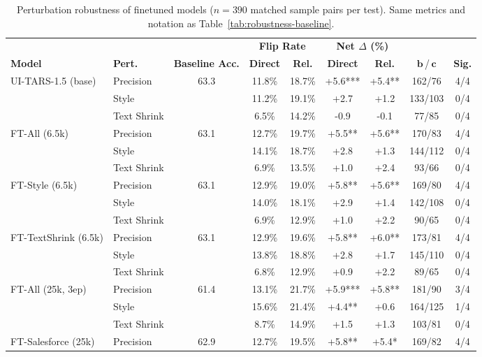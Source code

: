 \begin{table}[ht]
\centering
\caption{Perturbation robustness of finetuned models ($n = 390$ matched sample pairs per test). Same metrics and notation as Table~\ref{tab:robustness-baseline}.}
\label{tab:robustness-finetuned}
\scriptsize
\begin{tabular}{llc cc cc cc}
\toprule
 & & & \multicolumn{2}{c}{\textbf{Flip Rate}} & \multicolumn{2}{c}{\textbf{Net $\Delta$ (\%)}} & & \\
\cmidrule(lr){4-5} \cmidrule(lr){6-7}
\textbf{Model} & \textbf{Pert.} & \textbf{Baseline Acc.} & \textbf{Direct} & \textbf{Rel.} & \textbf{Direct} & \textbf{Rel.} & $\boldsymbol{b}$\,/\,$\boldsymbol{c}$ & \textbf{Sig.} \\
\midrule
UI-TARS-1.5 (base) & Precision & 63.3 & 11.8\% & 18.7\% & +5.6*** & +5.4** & 162/76 & 4/4 \\
 & Style &  & 11.2\% & 19.1\% & +2.7 & +1.2 & 133/103 & 0/4 \\
 & Text Shrink &  & 6.5\% & 14.2\% & -0.9 & -0.1 & 77/85 & 0/4 \\
\midrule
FT-All (6.5k) & Precision & 63.1 & 12.7\% & 19.7\% & +5.5** & +5.6** & 170/83 & 4/4 \\
 & Style &  & 14.1\% & 18.7\% & +2.8 & +1.3 & 144/112 & 0/4 \\
 & Text Shrink &  & 6.9\% & 13.5\% & +1.0 & +2.4 & 93/66 & 0/4 \\
\midrule
FT-Style (6.5k) & Precision & 63.1 & 12.9\% & 19.0\% & +5.8** & +5.6** & 169/80 & 4/4 \\
 & Style &  & 14.0\% & 18.1\% & +2.9 & +1.4 & 142/108 & 0/4 \\
 & Text Shrink &  & 6.9\% & 12.9\% & +1.0 & +2.2 & 90/65 & 0/4 \\
\midrule
FT-TextShrink (6.5k) & Precision & 63.1 & 12.9\% & 19.6\% & +5.8** & +6.0** & 173/81 & 4/4 \\
 & Style &  & 13.8\% & 18.8\% & +2.8 & +1.7 & 145/110 & 0/4 \\
 & Text Shrink &  & 6.8\% & 12.9\% & +0.9 & +2.2 & 89/65 & 0/4 \\
\midrule
FT-All (25k, 3ep) & Precision & 61.4 & 13.1\% & 21.7\% & +5.9*** & +5.8** & 181/90 & 3/4 \\
 & Style &  & 15.6\% & 21.4\% & +4.4** & +0.6 & 164/125 & 1/4 \\
 & Text Shrink &  & 8.7\% & 14.9\% & +1.5 & +1.3 & 103/81 & 0/4 \\
\midrule
FT-Salesforce (25k) & Precision & 62.9 & 12.7\% & 19.5\% & +5.8** & +5.4* & 169/82 & 4/4 \\

\end{tabular}
\end{table}
